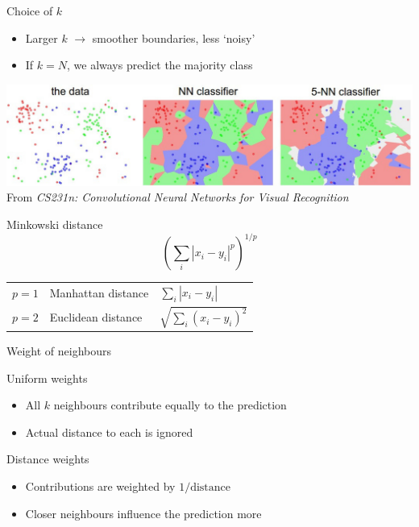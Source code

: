 \begin{frame}{Choice of $k$}
    \begin{itemize}
        \item Larger $k$ $\rightarrow$ smoother boundaries, less `noisy'
        \item If $k = N$, we always predict the majority class
    \end{itemize}
    \vfill
    \begin{center}
        \includegraphics[width=\textwidth]{figures/k_effect} \\
        {\scriptsize%
         From \textit{CS231n: Convolutional Neural Networks for Visual Recognition}}
    \end{center}
\end{frame}

\begin{frame}{Minkowski distance}
    \[
        \left( \sum_{i} \left| x_{i} - y_{i} \right|^{p} \right)^{\!1/p}
    \]
    \vfill
    \begin{center}
        \renewcommand*{\arraystretch}{1.5}
        \begin{tabular}{lll}
            \toprule
            $p = 1$ & Manhattan distance & $\sum_{i} \left| x_{i} - y_{i} \right|$ \\
            $p = 2$ & Euclidean distance & $\sqrt{\sum_{i} \left( x_{i} - y_{i} \right)^{2}}$ \\
            \bottomrule
        \end{tabular}
    \end{center}
\end{frame}

\begin{frame}{Weight of neighbours}
    \begin{block}{Uniform weights}
        \begin{itemize}
            \item All $k$ neighbours contribute equally to the prediction
            \item Actual distance to each is ignored
        \end{itemize}
    \end{block}
    \vfill
    \begin{block}{Distance weights}
        \begin{itemize}
            \item Contributions are weighted by $1 / \text{distance}$
            \item Closer neighbours influence the prediction more
        \end{itemize}
    \end{block}
\end{frame}

